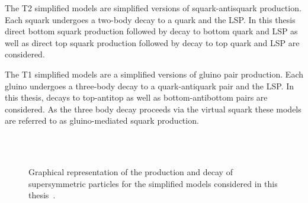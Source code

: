 The T2 simplified models are simplified versions of squark-antisquark production. Each squark undergoes
a two-body decay to a quark and the LSP. In this thesis direct bottom squark production followed
by decay to bottom quark and LSP as well as direct top squark production followed by decay to top
quark and LSP are considered.

The T1 simplified models are a simplified versions of gluino pair production. Each gluino undergoes a three-body 
decay to a quark-antiquark pair and the LSP. In this thesis, decays to top-antitop as well as bottom-antibottom
pairs are considered. As the three body decay proceeds via the virtual squark these models 
are referred to as gluino-mediated squark production.

\begin{figure}[h!]
  \begin{center}
     ~~
     \\
     ~~
    \caption{
      Graphical representation of the production and decay of supersymmetric particles 
      for the simplified models considered in this thesis~\cite{SMS}.
    }
    \label{fig:simplified-models-feyn}
  \end{center}
\end{figure}

